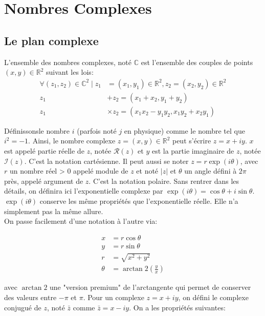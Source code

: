 \chapter{Nombres Complexes}
\section{Le plan complexe}

L'ensemble des nombres complexes, noté $\mathbb{C}$ est l'ensemble des couples de points $(x, y) \in \mathbb{R}^2$ suivant les lois:
\begin{align}
\forall\left(z_1, z_2\right) \in \mathbb{C}^2 \mid z_1 & =\left(x_1, y_1\right) \in \mathbb{R}^2, z_2=\left(x_2, y_2\right) \in \mathbb{R}^2 \\
z_1 & +z_2=\left(x_1+x_2, y_1+y_2\right) \\
z_1 & \times z_2=\left(x_1 x_2-y_1 y_2, x_1 y_2+x_2 y_1\right)
\end{align}

Définissonsle nombre $i$ (parfois noté $j$ en physique) comme le nombre tel que $i^2=-1$. Ainsi, le nombre complexe $z=(x, y) \in \mathbb{R}^2$ peut s'écrire $z=x+i y$. $x$ est appelé partie réelle de $z$, notée $\mathcal{R}(z)$ et $y$ est la partie imaginaire de $z$, notée $\mathcal{I}(z)$. C'est la notation cartésienne. Il peut aussi se noter $z = r \exp(i \theta)$, avec $r$ un nombre réel > 0 appelé module de $z$ et noté $|z|$ et $\theta$ un angle défini à $2\pi$ près, appelé argument de $z$. C'est la notation polaire. Sans rentrer dans les détails, on définira ici l'exponentielle complexe par $\exp(i \theta) = \cos \theta + i \sin \theta$. $\exp(i \theta)$ conserve les même propriétés que l'exponentielle réelle. Elle n'a simplement pas la même allure.\\

On passe facilement d'une notation à l'autre via:

\begin{align}
    x &= r \cos \theta\\
    y &= r \sin \theta\\
    r &= \sqrt{x^2+y^2}\\
    \theta &= \arctan2 \left(\frac{y}{x}\right)
\end{align}

avec $ \arctan2$ une "version premium" de l'arctangente qui permet de conserver des valeurs entre $-\pi$ et $\pi$. Pour un complexe $z=x+i y$, on défini le complexe conjugué de $z$, noté $\bar{z}$ comme $\bar{z}=x-i y$. On a les propriétés suivantes:

